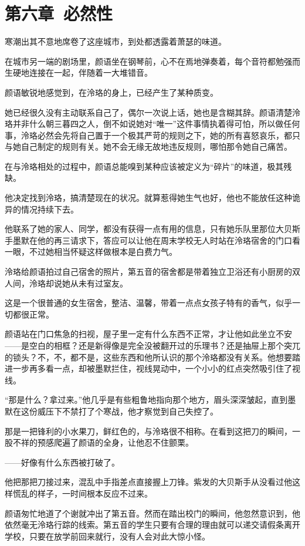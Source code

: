 \documentclass[UTF8, scheme = chinese, openany]{ctexbook}
\begin{document}
\chapter{第六章\ 必然性}

寒潮出其不意地席卷了这座城市，到处都透露着萧瑟的味道。

在城市另一端的剧场里，颜语坐在钢琴前，心不在焉地弹奏着，每个音符都勉强而生硬地连接在一起，伴随着一大堆错音。

颜语敏锐地感觉到，在泠珞的身上，已经产生了某种质变。

她已经很久没有主动联系自己了，偶尔一次说上话，她也是含糊其辞。颜语清楚泠珞并非什么朝三暮四之人，倒不如说她对“唯一”这件事情执着得可怕，所以做任何事，泠珞必然会先将自己置于一个极其严苛的规则之下，她的所有喜怒哀乐，都只与她自己制定的规则有关。她不会无缘无故地违反规则，哪怕那令她自己痛苦。

在与泠珞相处的过程中，颜语总能嗅到某种应该被定义为“碎片”的味道，极其残缺。

他决定找到泠珞，搞清楚现在的状况。就算惹得她生气也好，他也不能放任这种诡异的情况持续下去。

他联系了她的家人、同学，都没有获得一点有用的信息，只有她乐队里那位大贝斯手墨默在他的再三请求下，答应可以让他在周末学校无人时站在泠珞宿舍的门口看一眼，不过她相当怀疑这样做根本是白费力气。

泠珞给颜语拍过自己宿舍的照片，第五音的宿舍都是带着独立卫浴还有小厨房的双人间，泠珞却说她从未有过室友。

这是一个很普通的女生宿舍，整洁、温馨，带着一点点女孩子特有的香气，似乎一切都很正常。

颜语站在门口焦急的扫视，屋子里一定有什么东西不正常，才让他如此坐立不安——是空白的相框？还是新得像是完全没被翻开过的乐理书？还是抽屉上那个突兀的锁头？不，不，都不是，这些东西和他所认识的那个泠珞都没有关系。他想要踏进一步再多看一点，却被墨默拦住，视线晃动中，一个小小的红点突然吸引住了视线。

“那是什么？拿过来。”他几乎是有些粗鲁地指向那个地方，眉头深深皱起，直到墨默在这份威压下不禁打了个寒战，他才察觉到自己失控了。

那是一把锋利的小水果刀，鲜红色的，与泠珞很不相称。在看到这把刀的瞬间，一股不祥的预感爬遍了颜语的全身，让他忍不住颤栗。

——好像有什么东西被打破了。

他把那把刀接过来，混乱中手指差点直接握上刀锋。紫发的大贝斯手从没看过他这样慌乱的样子，一时间根本反应不过来。

颜语匆忙地道了个谢就冲出了第五音。然而在踏出校门的瞬间，他忽然意识到，他依然毫无泠珞行踪的线索。第五音的学生只要有合理的理由就可以递交请假条离开学校，只要在放学前回来就行，没有人会对此大惊小怪。
\end{document}
